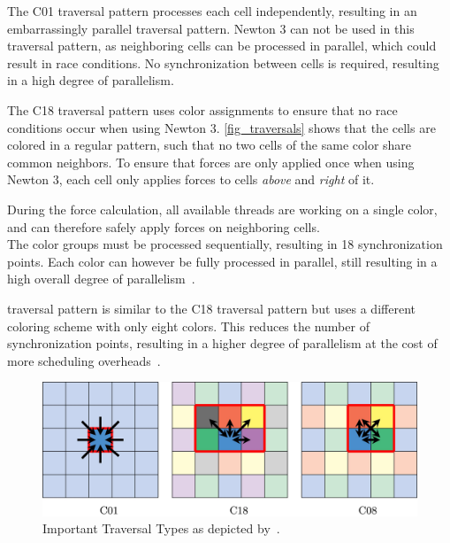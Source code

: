 \documentclass[conference]{IEEEtran}
\begin{document}
\begin{description}[style=nextline]
        \begin{description}[style=nextline, font=\itshape\mdseries]
            \item[$\bullet$ C01]
                The C01 traversal pattern processes each cell independently, resulting in an embarrassingly parallel traversal pattern. Newton 3 can not be used in this traversal pattern, as neighboring cells can be processed in parallel, which could result in race conditions. No synchronization between cells is required, resulting in a high degree of parallelism.
            \item[$\bullet$ C18]
                The C18 traversal pattern uses color assignments to ensure that no race conditions occur when using Newton 3. \autoref{fig_traversals} shows that the cells are colored in a regular pattern, such that no two cells of the same color share common neighbors. To ensure that forces are only applied once when using Newton 3, each cell only applies forces to cells \textit{above} and \textit{right} of it.

                During the force calculation, all available threads are working on a single color, and can therefore safely apply forces on neighboring cells. \\
                The color groups must be processed sequentially, resulting in 18 synchronization points. Each color can however be fully processed in parallel, still resulting in a high overall degree of parallelism~\cite{NEWCOME2023115278}.
            \item[$\bullet$ C08]
                traversal pattern is similar to the C18 traversal pattern but uses a different coloring scheme with only eight colors. This reduces the number of synchronization points, resulting in a higher degree of parallelism at the cost of more scheduling overheads~\cite{NEWCOME2023115278}.
        \end{description}

        \begin{figure}[H]
            \centering
            \includegraphics[width=\columnwidth]{figures/traversals.jpg}
            \caption{Important Traversal Types as depicted by~\cite{NEWCOME2023115278}.}
            \label{fig_traversals}
        \end{figure}


\end{description}
\end{document}
